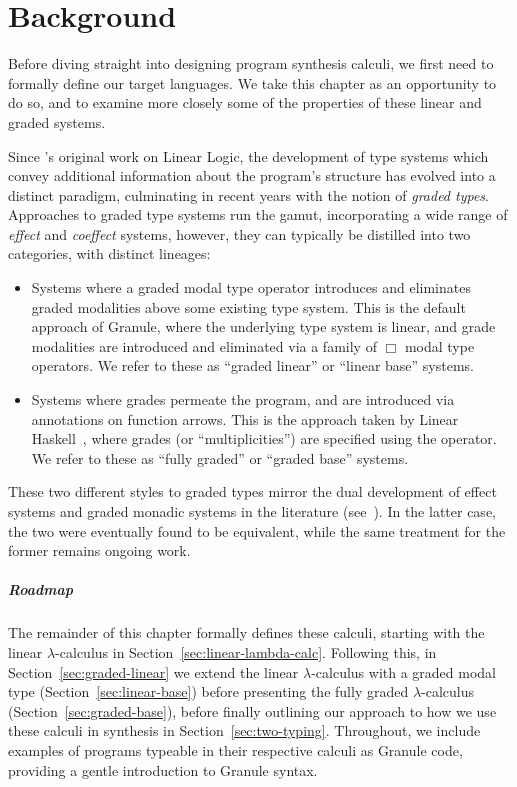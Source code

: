 \chapter{Background}
\label{chapter:background}
Before diving straight into designing program synthesis calculi, we first need
to formally define our target languages. We take
this chapter as an opportunity to do so, and to examine more closely some
of the properties of these linear and graded systems. 

Since \citet{girard1987linear}'s original work on Linear Logic, the development
of type systems which convey additional information about the program's
structure has evolved into a distinct paradigm, culminating in recent years with
the notion of \textit{graded types}. Approaches to graded type systems run the
gamut, incorporating a wide range of \emph{effect} and \emph{coeffect} systems,
however, they can typically be distilled into two categories, with distinct
lineages: 
\begin{itemize}
  \item Systems where a graded modal type operator introduces and eliminates
        graded modalities above some existing type system. This is the default
        approach of Granule, where the underlying type system is linear, and
        grade modalities are introduced and eliminated via a family of $\Box$
        modal type operators. We refer to these as ``graded linear'' or ``linear
        base'' systems.
  \item Systems where grades permeate the program, and are introduced via
        annotations on function arrows. This is the approach taken by Linear
        Haskell~\citep{DBLP:journals/pacmpl/BernardyBNJS18}, where grades (or
        ``multiplicities'') are specified using the \granin{\%} operator. We
        refer to these as ``fully graded'' or ``graded base'' systems.
\end{itemize}  
These two different styles to graded types mirror the dual development of effect
systems and graded monadic systems in the literature
(see~\citet{10.1145/601775.601776}). In the latter case, the two were eventually
found to be equivalent, while the same treatment for the former remains ongoing
work. 

\paragraph{Roadmap} The remainder of this chapter formally defines these calculi, starting with the
linear $\lambda$-calculus in Section~\ref{sec:linear-lambda-calc}. Following
this, in Section~\ref{sec:graded-linear} we extend the linear $\lambda$-calculus
with a graded modal type (Section~\ref{sec:linear-base}) before presenting the
fully graded $\lambda$-calculus (Section~\ref{sec:graded-base}), before finally
outlining our approach to how we use these calculi in synthesis in
Section~\ref{sec:two-typing}. Throughout, we include examples of programs
typeable in their respective calculi as Granule code, providing a gentle
introduction to Granule syntax. 

